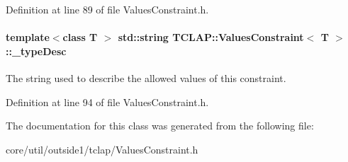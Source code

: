 Definition at line 89 of file Values\+Constraint.\+h.

\paragraph[{\texorpdfstring{\+\_\+type\+Desc}{_typeDesc}}]{\setlength{\rightskip}{0pt plus 5cm}template$<$class T $>$ std\+::string {\bf T\+C\+L\+A\+P\+::\+Values\+Constraint}$<$ T $>$\+::\+\_\+type\+Desc\hspace{0.3cm}{\ttfamily [protected]}}\hypertarget{classTCLAP_1_1ValuesConstraint_a6ebc63fa5eea116a50aa5f76aee56fd6}{}\label{classTCLAP_1_1ValuesConstraint_a6ebc63fa5eea116a50aa5f76aee56fd6}
The string used to describe the allowed values of this constraint. 

Definition at line 94 of file Values\+Constraint.\+h.



The documentation for this class was generated from the following file\+:\begin{DoxyCompactItemize}
\item 
core/util/outside1/tclap/Values\+Constraint.\+h\end{DoxyCompactItemize}
